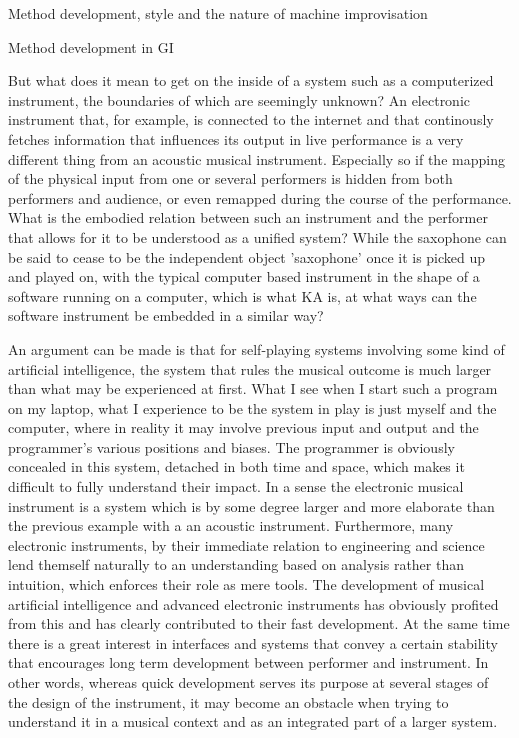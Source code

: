 \documentclass[presentation]{beamer}
\begin{document}
\begin{frame}[label={sec:org08c5441}]{Method development, style and the nature of machine improvisation}
\begin{block}{Method development in GI}
{{But what does it mean to get on the inside of a system such as a computerized instrument, the boundaries of which are seemingly unknown? An electronic instrument that, for example, is connected to the internet and that continously fetches information that influences its output in live performance is a very different thing from an acoustic musical instrument. Especially so if the mapping of the physical input from one or several performers is hidden from both performers and audience, or even remapped during the course of the performance. What is the embodied relation between such an instrument and the performer that allows for it to be understood as a unified system? While the saxophone can be said to cease to be the independent object 'saxophone' once it is picked up and played on, with the typical computer based instrument in the shape of a software running on a computer, which is what KA is, at what ways can the software instrument be embedded in a similar way?

An argument can be made is that for self-playing systems involving some kind of artificial intelligence, the system that rules the musical outcome is much larger than what may be experienced at first. What I see when I start such a program on my laptop, what I experience to be the system in play is just myself and the computer, where in reality it may involve previous input and output and the programmer's various positions and biases. The programmer is obviously concealed in this system, detached in both time and space, which makes it difficult to fully understand their impact. In a sense the electronic musical instrument is a system which is by some degree larger and more elaborate than the previous example with a an acoustic instrument. Furthermore, many electronic instruments, by their immediate relation to engineering and science lend themself naturally to an understanding based on analysis rather than intuition, which enforces their role as mere tools. The development of musical artificial intelligence and advanced electronic instruments has obviously profited from this and has clearly contributed to their fast development. At the same time there is a great interest in interfaces and systems that convey a certain stability that encourages long term development between performer and instrument. In other words, whereas quick development serves its purpose at several stages of the design of the instrument, it may become an obstacle when trying to understand it in a musical context and as an integrated part of a larger system.

}}
\end{block}
\end{frame}
\end{document}
